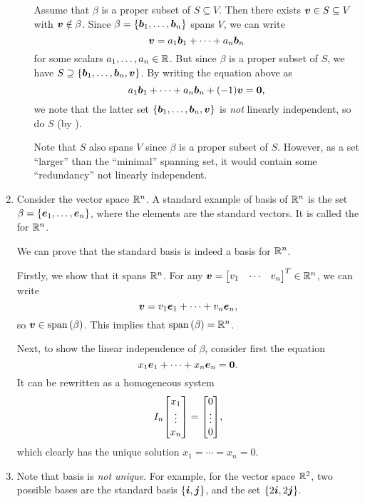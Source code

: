 \begin{enumerate}
\begin{enumerate}
\begin{pf}
Assume that \(\beta\) is a proper subset of \(S\subseteq V\). Then there exists
\(\vb*{v}\in S\subseteq V\) with \(\vb*{v}\notin \beta\). Since
\(\beta=\{\vb*{b}_1,\dotsc,\vb*{b}_n\}\) spans \(V\), we can write
\[
\vb*{v}=a_1\vb*{b}_1+\dotsb+a_n\vb*{b}_n
\]
for some scalars \(a_1,\dotsc,a_n\in\mathbb{R}\). But since \(\beta\) is a proper
subset of \(S\), we have \(S\supseteq
\{\vb*{b}_1,\dotsc,\vb*{b}_n,\vb*{v}\}\). By writing the equation above as
\[
a_1\vb*{b}_1+\dotsb+a_n\vb*{b}_n+(-1)\vb*{v}=\vb*{0},
\]
we note that the latter set \(\{\vb*{b}_1,\dotsc,\vb*{b}_n,\vb*{v}\}\) is
\emph{not} linearly independent, so do \(S\) (by ).
\end{pf}
\begin{intuition}
Note that \(S\) also spans \(V\) since \(\beta\) is a proper subset of \(S\).
However, as a set ``larger'' than the ``minimal'' spanning set, it would
contain some ``redundancy''  not linearly independent.
\end{intuition}
\end{enumerate}
\item Consider the vector space \(\mathbb{R}^n\). A standard example of basis of
\(\mathbb{R}^n\) is the set \(\beta=\{\vb*{e}_1,\dotsc,\vb*{e}_n\}\), where the
elements are the standard vectors. It is called the  for
\(\mathbb{R}^n\).

\begin{pf}
We can prove that the standard basis is indeed a basis for \(\mathbb{R}^n\).

Firstly, we show that it spans \(\mathbb{R}^n\). For any
\(\vect{v}=\mqty[v_1&\cdots&v_n]^{T}\in\R^n\), we can write
\[
\vb*{v}=v_1\vb*{e}_1+\dotsb+v_n\vb*{e}_n,
\]
so \(\vb*{v}\in\operatorname{span}\qty(\beta)\). This implies that \(\operatorname{span}\qty(\beta)=\mathbb{R}^n\).

Next, to show the linear independence of \(\beta\), consider first the equation
\[
x_1\vb*{e}_1+\dotsb+x_n\vb*{e}_n=\vb*{0}.
\]
It can be rewritten as a homogeneous system
\[
I_n\mqty[x_1\\ \vdots\\ x_n]=\mqty[0\\ \vdots\\ 0],
\]
which clearly has the unique solution \(x_1=\dotsb=x_n=0\).
\end{pf}
\item Note that basis is \emph{not unique}. For example, for the vector space
\(\mathbb{R}^2\), two possible bases are the standard basis \(\{\vb*{i},\vb*{j}\}\),
and the set \(\{2\vb*{i},2\vb*{j}\}\).


\end{enumerate}
